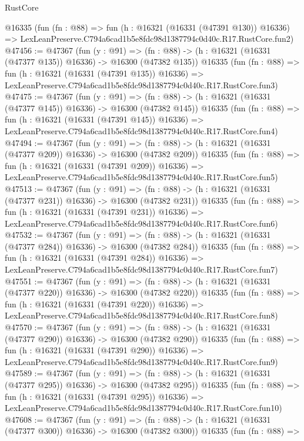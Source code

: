 \begin{lexlean}{RustCore}
\begin{coremodule}
    @16335
    (fun (fn : @88) =>
    fun (h : @16321 (@16331 (@47391 @130)) @16336) =>
    LexLeanPreserve.C794a6cad1b5e8fdc98d1387794c0d40c.R17.RustCore.fun2)
@47456 := @47367
    (fun (y : @91) =>
    (fn : @88) -> (h : @16321 (@16331 (@47377 @135)) @16336) -> @16300 (@47382 @135))
    @16335
    (fun (fn : @88) =>
    fun (h : @16321 (@16331 (@47391 @135)) @16336) =>
    LexLeanPreserve.C794a6cad1b5e8fdc98d1387794c0d40c.R17.RustCore.fun3)
@47475 := @47367
    (fun (y : @91) =>
    (fn : @88) -> (h : @16321 (@16331 (@47377 @145)) @16336) -> @16300 (@47382 @145))
    @16335
    (fun (fn : @88) =>
    fun (h : @16321 (@16331 (@47391 @145)) @16336) =>
    LexLeanPreserve.C794a6cad1b5e8fdc98d1387794c0d40c.R17.RustCore.fun4)
@47494 := @47367
    (fun (y : @91) =>
    (fn : @88) -> (h : @16321 (@16331 (@47377 @209)) @16336) -> @16300 (@47382 @209))
    @16335
    (fun (fn : @88) =>
    fun (h : @16321 (@16331 (@47391 @209)) @16336) =>
    LexLeanPreserve.C794a6cad1b5e8fdc98d1387794c0d40c.R17.RustCore.fun5)
@47513 := @47367
    (fun (y : @91) =>
    (fn : @88) -> (h : @16321 (@16331 (@47377 @231)) @16336) -> @16300 (@47382 @231))
    @16335
    (fun (fn : @88) =>
    fun (h : @16321 (@16331 (@47391 @231)) @16336) =>
    LexLeanPreserve.C794a6cad1b5e8fdc98d1387794c0d40c.R17.RustCore.fun6)
@47532 := @47367
    (fun (y : @91) =>
    (fn : @88) -> (h : @16321 (@16331 (@47377 @284)) @16336) -> @16300 (@47382 @284))
    @16335
    (fun (fn : @88) =>
    fun (h : @16321 (@16331 (@47391 @284)) @16336) =>
    LexLeanPreserve.C794a6cad1b5e8fdc98d1387794c0d40c.R17.RustCore.fun7)
@47551 := @47367
    (fun (y : @91) =>
    (fn : @88) -> (h : @16321 (@16331 (@47377 @220)) @16336) -> @16300 (@47382 @220))
    @16335
    (fun (fn : @88) =>
    fun (h : @16321 (@16331 (@47391 @220)) @16336) =>
    LexLeanPreserve.C794a6cad1b5e8fdc98d1387794c0d40c.R17.RustCore.fun8)
@47570 := @47367
    (fun (y : @91) =>
    (fn : @88) -> (h : @16321 (@16331 (@47377 @290)) @16336) -> @16300 (@47382 @290))
    @16335
    (fun (fn : @88) =>
    fun (h : @16321 (@16331 (@47391 @290)) @16336) =>
    LexLeanPreserve.C794a6cad1b5e8fdc98d1387794c0d40c.R17.RustCore.fun9)
@47589 := @47367
    (fun (y : @91) =>
    (fn : @88) -> (h : @16321 (@16331 (@47377 @295)) @16336) -> @16300 (@47382 @295))
    @16335
    (fun (fn : @88) =>
    fun (h : @16321 (@16331 (@47391 @295)) @16336) =>
    LexLeanPreserve.C794a6cad1b5e8fdc98d1387794c0d40c.R17.RustCore.fun10)
@47608 := @47367
    (fun (y : @91) =>
    (fn : @88) -> (h : @16321 (@16331 (@47377 @300)) @16336) -> @16300 (@47382 @300))
    @16335
    (fun (fn : @88) =>

\end{coremodule}
\end{lexlean}
